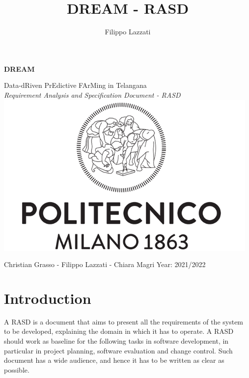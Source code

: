 \documentclass{article}
\title{DREAM - RASD}
\author{Filippo Lazzati}
\begin{document}
\thispagestyle{empty} 
\begin{titlepage}
    \begin{center}
       {\Huge \textbf{DREAM}} %
       \vspace{0.5cm}
       \\
    \begin{LARGE}
        {Data-dRiven PrEdictive FArMing in Telangana}
        \vspace{1.0cm}
        \\
        {\textit{Requirement Analysis and Specification Document - RASD}}
        \includegraphics[width=13cm]{logo/polimi.png}
       \vspace{1.5cm}
        
        {Christian Grasso - Filippo Lazzati - Chiara Magri}
       \vspace{0.5cm}
       {Year: 2021/2022}
       
    \end{LARGE}  
   \end{center}
\end{titlepage}
\newpage
\tableofcontents 
\newpage
\listoffigures
\newpage
\listoftables
\newpage
\section{Introduction}
A RASD is a document that aims to present all the requirements of the system to be developed, explaining the 
domain in which it has to operate. A RASD should work as baseline for the following tasks in software development,
in particular in project planning, software evaluation and change control. Such document has a wide audience, and hence it has to
be written as clear as possible.
\end{document}
